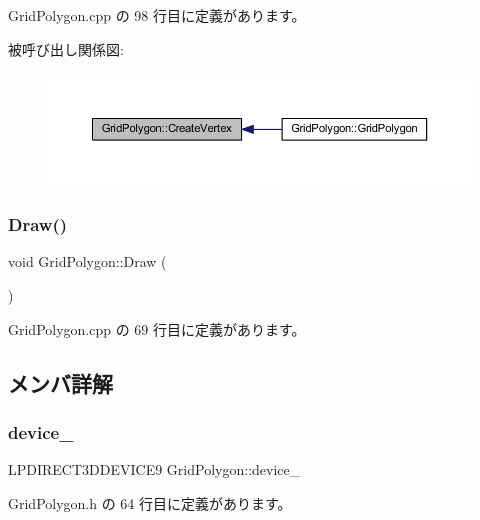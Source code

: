  Grid\+Polygon.\+cpp の 98 行目に定義があります。

被呼び出し関係図\+:\nopagebreak
\begin{figure}[H]
\begin{center}
\leavevmode
\includegraphics[width=350pt]{class_grid_polygon_a07b1e9c012d36086569860a30deb85d5_icgraph}
\end{center}
\end{figure}
\mbox{\label{class_grid_polygon_a93a672fb9d5b6757c132fba8792f5459}} 
\subsubsection{\texorpdfstring{Draw()}{Draw()}}
{\footnotesize\ttfamily void Grid\+Polygon\+::\+Draw (\begin{DoxyParamCaption}{ }\end{DoxyParamCaption})}



 Grid\+Polygon.\+cpp の 69 行目に定義があります。



\subsection{メンバ詳解}
\mbox{\label{class_grid_polygon_a23d509ae7ad001e003897527380a8ca8}} 
\subsubsection{\texorpdfstring{device\+\_\+}{device\_}}
{\footnotesize\ttfamily L\+P\+D\+I\+R\+E\+C\+T3\+D\+D\+E\+V\+I\+C\+E9 Grid\+Polygon\+::device\+\_\+\hspace{0.3cm}{\ttfamily [private]}}



 Grid\+Polygon.\+h の 64 行目に定義があります。

